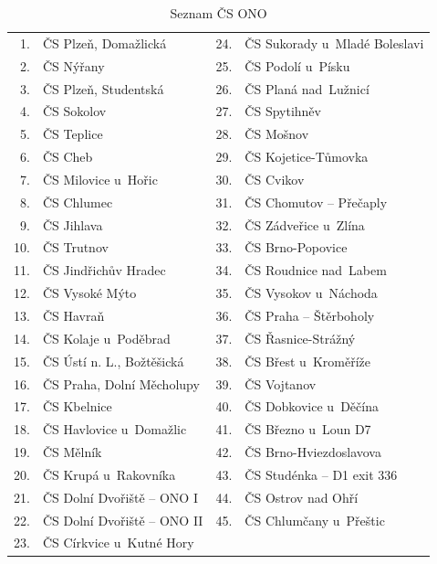 \begin{table}[h]
    \centering
    \caption{Seznam ČS ONO}
    \label{tab:tank-ono-pobocky}
    \begin{tabular}{r l|r l}
        1.    & ČS Plzeň, Domažlická        & 24.   & ČS Sukorady u~Mladé
                                                        Boleslavi\\
        2.    & ČS Nýřany                   & 25.   & ČS Podolí u~Písku\\
        3.    & ČS Plzeň, Studentská        & 26.   & ČS Planá nad~Lužnicí\\
        4.    & ČS Sokolov                  & 27.   & ČS Spytihněv\\
        5.    & ČS Teplice                  & 28.   & ČS Mošnov\\
        6.    & ČS Cheb                     & 29.   & ČS Kojetice-Tůmovka\\
        7.    & ČS Milovice u~Hořic         & 30.   & ČS Cvikov\\
        8.    & ČS Chlumec                  & 31.   & ČS Chomutov – Přečaply\\
        9.    & ČS Jihlava                  & 32.   & ČS Zádveřice u~Zlína\\
        10.   & ČS Trutnov                  & 33.   & ČS Brno-Popovice\\
        11.   & ČS Jindřichův Hradec        & 34.   & ČS Roudnice nad~Labem\\
        12.   & ČS Vysoké Mýto              & 35.   & ČS Vysokov u~Náchoda\\
        13.   & ČS Havraň                   & 36.   & ČS Praha – Štěrboholy\\
        14.   & ČS Kolaje u~Poděbrad        & 37.   & ČS Řasnice-Strážný\\
        15.   & ČS Ústí n. L., Božtěšická   & 38.   & ČS Břest u~Kroměříže\\
        16.   & ČS Praha, Dolní Měcholupy   & 39.   & ČS Vojtanov\\
        17.   & ČS Kbelnice                 & 40.   & ČS Dobkovice u~Děčína\\
        18.   & ČS Havlovice u~Domažlic     & 41.   & ČS Březno u~Loun D7\\
        19.   & ČS Mělník                   & 42.   & ČS Brno-Hviezdoslavova\\
        20.   & ČS Krupá u~Rakovníka        & 43.   & ČS Studénka – D1
                                                        exit 336\\
        21.   & ČS Dolní Dvořiště – ONO I   & 44.   & ČS Ostrov nad Ohří\\
        22.   & ČS Dolní Dvořiště – ONO II  & 45.   & ČS Chlumčany u~Přeštic\\
        23.   & ČS Církvice u~Kutné Hory
    \end{tabular}
\end{table}

